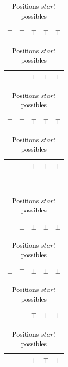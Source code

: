 \documentclass[a4paper,12pt]{report}
\newcommand\black{\cellcolor{black}}
\newcommand\grey{\cellcolor{black!50}}
\begin{document}
\begin{table}[H]
    \begin{subtable}[B]{0.5\textwidth}
    \centering
		\begin{tabular}{|c|c|c|c|c|}
			\hline
			\black $\top$ & \black $\top$  & \color{white}$\top$ & \color{white}$\top$ & \color{white}$\top$ \\ 			
			\hline
		\end{tabular}
		
		\begin{tabular}{|c|c|c|c|c|}
		\hline
		\color{white}$\top$ & \black $\top$ & \black $\top$  & \color{white}$\top$ & \color{white}$\top$ \\ 			
		\hline
		\end{tabular}	
		
		\begin{tabular}{|c|c|c|c|c|}
		\hline
		 \color{white}$\top$ & \color{white}$\top$ & \black $\top$ & \black $\top$  & \color{white}$\top$ \\ 			
		\hline
		\end{tabular}
		
		\begin{tabular}{|c|c|c|c|c|}
		\hline
		 \color{white}$\top$ &  \color{white}$\top$ & \color{white}$\top$ & \black $\top$ & \black $\top$ \\ 			
		\hline
		\end{tabular}
			
        \caption{Positions d'une bande 2 dans un espace 5}
        \label{table:exempleUneBande}
    \end{subtable}
    ~
    \begin{subtable}[B]{0.5\textwidth}
        \centering
			\begin{tabular}{|c|c|c|c|c|}
			\hline 
			\grey $\top$ & $\bot$ & $\bot$  & $\bot$ & $\bot$ \\ 
			\hline
			\end{tabular}
			
			\begin{tabular}{|c|c|c|c|c|}
			\hline 
			$\bot$ & \grey $\top$ & $\bot$  & $\bot$ & $\bot$ \\ 
			\hline
			\end{tabular}
			
			\begin{tabular}{|c|c|c|c|c|}
			\hline 
			$\bot$ & $\bot$ & \grey $\top$  & $\bot$ & $\bot$ \\ 
			\hline
			\end{tabular}

			\begin{tabular}{|c|c|c|c|c|}
			\hline 
			$\bot$ & $\bot$ & $\bot$ & \grey $\top$ & $\bot$\\ 
			\hline
			\end{tabular}
			
        \caption{Positions $start$ possibles}
        \label{table:PosPossible}
    \end{subtable}
\end{table}
\end{document}
